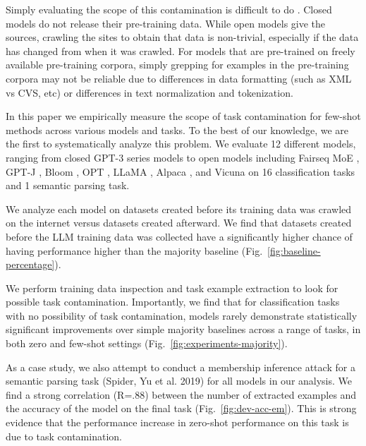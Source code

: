 \documentclass[letterpaper]{article} %
\newcommand{\nilay}[1]{}
\begin{document}
Simply evaluating the scope of this contamination is difficult to do \cite{ magar2022, jacovi2023}.  Closed models do not release their pre-training data.  While open models give the sources, crawling the sites to obtain that data is non-trivial, especially if the data has changed from when it was crawled.  For models that are pre-trained on freely available pre-training corpora, simply grepping for examples in the pre-training corpora may not be reliable due to differences in data formatting (such as XML vs CVS, etc) or differences in text normalization and tokenization.

In this paper we empirically measure the scope of task contamination for few-shot methods across various models and tasks. To the best of our knowledge, we are the first to systematically analyze this problem. We evaluate 12 different models, ranging from closed GPT-3 series models \cite{openai2023a} to open models including Fairseq MoE \cite{artetxe2022}, GPT-J \cite{gpt-j}, Bloom \cite{scao2022}, OPT \cite{zhang2022} ,  LLaMA \cite{touvron2023}, Alpaca \cite{alpaca}, and Vicuna \cite{vicuna2023} on 16 classification tasks and 1 semantic parsing task\nilay{Reviewers might be concerned with lack of seq2seq tasks.}.

We analyze each model on datasets created before its training data was crawled on the internet versus datasets created afterward. We find that datasets created before the LLM training data was collected have a significantly higher chance of having performance higher than the majority baseline (Fig.~\ref{fig:baseline-percentage}).

We perform training data inspection and task example extraction to look for possible task contamination.  Importantly, we find that for classification tasks with no possibility of task contamination, models rarely demonstrate statistically significant improvements over simple majority baselines across a range of tasks, in both zero and few-shot settings (Fig.~\ref{fig:experiments-majority}).


As a case study, we also attempt to conduct a membership inference attack for a semantic parsing task (Spider, Yu et al. 2019) for all models in our analysis. We find a strong correlation (R=.88) between the number of extracted examples and the accuracy of the model on the final task (Fig.~\ref{fig:dev-acc-em}).  This is strong evidence that the performance increase in zero-shot performance on this task is due to task contamination.
\end{document}
